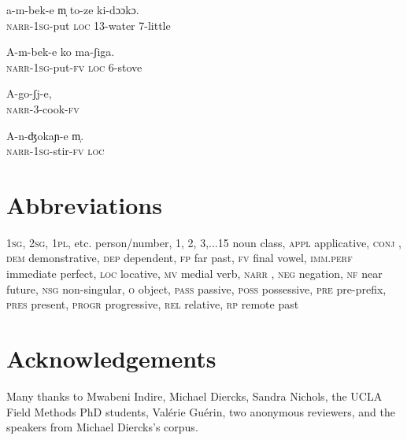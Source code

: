 \documentclass[output=paper]{LSP/langsci}
\begin{document}
 \begin{exe}
\ex \label{Saapp20}
\gll a-m-bek-e m̩ to-ze ki-dɔɔkɔ.\\
\textsc{narr}-\textsc{1sg}-put  \textsc{loc}  13-water  7-little\\
\glt {}
\end{exe}

 \begin{exe}
\ex \label{Saapp21}
\gll A-m-bek-e ko ma-ʃiga.\\
\textsc{narr}-\textsc{1sg}-put-\textsc{fv}  \textsc{loc}  6-stove\\
\glt {}
\end{exe}

 \begin{exe}
\ex \label{Saapp22}
\gll A-go-ʃj-e,\\
\textsc{narr}-3-cook-\textsc{fv}\\
\glt {}
\end{exe}

 \begin{exe}
\ex \label{Saapp23}
\gll A-n-ʤokaɲ-e m̩.\\
\textsc{narr}-\textsc{1sg}-stir-\textsc{fv}  \textsc{loc}\\
\glt {}
\end{exe}

\section*{Abbreviations}

\textsc{1sg, 2sg, 1pl}, etc.    person/number,
1, 2, 3,...15    noun class,
\textsc{appl}    applicative,
\textsc{conj}    ,
\textsc{dem}    demonstrative,
\textsc{dep}    dependent,
\textsc{fp}     far past,
\textsc{fv}  final vowel,
\textsc{imm.perf}  immediate perfect,
\textsc{loc}     locative,
\textsc{mv}    medial verb,
\textsc{narr}   ,
\textsc{neg}     negation,
\textsc{nf}     near future,
\textsc{nsg}    non-singular,
\textsc{o}     object,
\textsc{pass}    passive,
\textsc{poss}     possessive,
\textsc{pre}     pre-prefix,
\textsc{pres}     present,
\textsc{progr}   progressive,
\textsc{rel}     relative,
\textsc{rp}     remote past


\section*{Acknowledgements}
Many thanks to Mwabeni Indire, Michael Diercks, Sandra Nichols, the UCLA Field Methods PhD students, Valérie Guérin, two anonymous reviewers, and the speakers from Michael Diercks’s corpus. 


\printbibliography[heading=subbibliography,notkeyword=this] 
\end{document}
